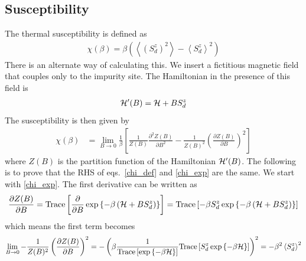 \documentclass[12pt,twoside]{article}
\numberwithin{equation}{section}
\begin{document}
\subsection{Susceptibility}
The thermal susceptibility is defined as
\begin{equation}\begin{aligned}
	\label{chi_def}
	\chi(\beta) = \beta \left(\left<\left(S_d^z\right)^2\right> - \left<S_d^z\right>^2\right)
\end{aligned}\end{equation}
There is an alternate way of calculating this. We insert a fictitious magnetic field that couples only to the impurity site. The Hamiltonian in the presence of this field is
\begin{equation}\begin{aligned}
	\mathcal{H}^\prime(B) = \mathcal{H} + B S_d^z
\end{aligned}\end{equation}
The susceptibility is then given by
\begin{equation}\begin{aligned}
	\label{chi_exp}
	\chi(\beta) &= \lim_{B \to 0}\frac{1}{\beta}\left[\frac{1}{Z(B)} \frac{\partial^2{Z(B)}}{\partial{B^2}}-\frac{1}{Z(B)^2} \left(\frac{\partial{Z(B)}}{\partial{B}}\right)^2\right]
\end{aligned}\end{equation}
where \(Z(B)\) is the partition function of the Hamiltonian \(\mathcal{H}^\prime(B)\). The following is to prove that the RHS of eqs.~\ref{chi_def} and \ref{chi_exp} are the same. We start with \ref{chi_exp}. The first derivative can be written as
\begin{equation}\begin{aligned}
	\frac{\partial{Z(B)}}{\partial{B}} = \text{Trace}\left[\frac{\partial{}}{\partial{B}} \exp\left\{-\beta\left( \mathcal{H} + BS_d^z \right) \right\}\right] = \text{Trace}\left[-\beta S_d^z \exp\left\{-\beta\left( \mathcal{H} + BS_d^z \right) \right\}\right]
\end{aligned}\end{equation}
which means the first term becomes
\begin{equation}\begin{aligned}
	\lim_{B \to 0}-\frac{1}{Z(B)^2} \left(\frac{\partial{Z(B)}}{\partial{B}}\right)^2 = -\left(\beta \frac{1}{\text{Trace}\left[\exp\left\{-\beta\mathcal{H}\right\}\right]} \text{Trace}\left[S_d^z \exp\left\{-\beta\mathcal{H}\right\}\right]\right)^2 = -\beta^2 \left<S_d^z\right>^2
\end{aligned}\end{equation}
\end{document}
